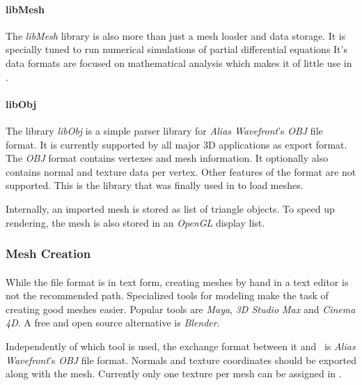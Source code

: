 \paragraph{libMesh}
The \textit{libMesh} library is also more than just a mesh loader and data storage.
It is specially tuned to run numerical simulations of partial differential equations
It's data formats are focused on mathematical analysis which makes it of little use in \ER.

\paragraph{libObj}
The library \textit{libObj}\cite{libobj} is a simple parser library for \textit{Alias Wavefront}'s \textit{OBJ} file format.
It is currently supported by all major 3D applications as export format.
The \textit{OBJ} format contains vertexes and mesh information.
It optionally also contains normal and texture data per vertex.
Other features of the format are not supported.
This is the library that was finally used in \ER to load meshes.

Internally, an imported mesh is stored as list of triangle objects.
To speed up rendering, the mesh is also stored in an \textit{OpenGL} display list.

\subsubsection{Mesh Creation}
\paragraph{}
While the file format is in text form, creating meshes by hand in a text editor is not the recommended path.
Specialized tools for modeling make the task of creating good meshes easier.
Popular tools are \textit{Maya}, \textit{3D Studio Max} and \textit{Cinema 4D}.
A free and open source alternative is \textit{Blender}.

Independently of which tool is used, the exchange format between it and \ER\ is \textit{Alias Wavefront}'s \textit{OBJ} file format.
Normals and texture coordinates should be exported along with the mesh.
Currently only one texture per mesh can be assigned in \ER.


